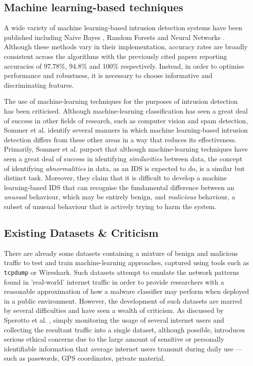 \documentclass[msc,deptreport, cs]{infthesis} %
\begin{document}
\subsection{Machine learning-based techniques}

A wide variety of machine learning-based intrusion detection systems have been published including Naive Bayes \cite{panda2007network} , Random Forests \cite{zhang2005network} and Neural Networks \cite{lee2001training}. Although these methods vary in their implementation, accuracy rates are broadly consistent across the algorithms with the previously cited papers reporting accuracies of 97.78\%, 94.8\% and 100\% respectively.   Instead, in order to optimise performance and robustness, it is necessary to choose informative and discriminating features.

The use of machine-learning techniques for the purposes of intrusion detection has been criticised. Although machine-learning classification has seen a great deal of success in other fields of research, such as computer vision and spam detection, Sommer et al. \cite{sommer2010outside} identify several manners in which machine learning-based intrusion detection differs from these other areas in a way that reduces its effectiveness. Primarily, Sommer et al. purport that although machine-learning techniques have seen a great deal of success in identifying \textit{similarities} between data, the concept of identifying \textit{abnormalities} in data, as an IDS is expected to do, is a similar but distinct task. Moreover, they claim that it is difficult to develop a machine learning-based IDS that can recognise the fundamental difference between an \textit{unusual} behaviour, which may be entirely benign, and \textit{malicious} behaviour, a subset of unusual behaviour that is actively trying to harm the system.

\subsection{Existing Datasets \& Criticism}
\label{sec:datasets}
There are already some datasets containing a mixture of benign and malicious traffic to test and train machine-learning approaches, captured using tools such as \texttt{tcpdump} or Wireshark. Such datasets attempt to emulate the network patterns found in 'real-world' internet traffic in order to provide researchers with a reasonable approximation of how a malware classifier may perform when deployed in a public environment. However, the development of such datasets are marred by several difficulties and have seen a wealth of criticism. As discussed by Sperotto et al. \cite{sperotto2009labeled}, simply monitoring the usage of several internet users and collecting the resultant traffic into a single dataset, although possible, introduces serious ethical concerns due to the large amount of sensitive or personally identifiable information that average internet users transmit during daily use --- such as passwords, GPS coordinates, private material.
\end{document}
